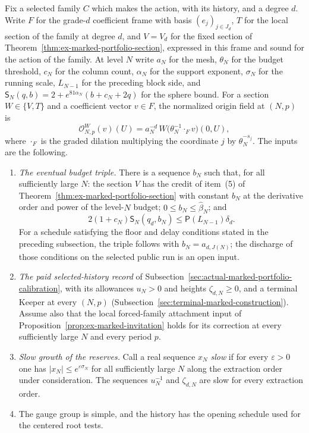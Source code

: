 Fix a selected family $C$ which makes the action, with its history, and a
degree $d$. Write $F$ for the grade-$d$ coefficient frame with basis
$(e_j)_{j\in J_d}$, $T$ for the local section of the family at degree
$d$, and $V=V_d$ for the fixed section of
Theorem~\ref{thm:ex-marked-portfolio-section}, expressed in this frame and
sound for the action of the family. At level $N$ write $a_N$ for the
mesh, $\theta_N$ for the budget threshold, $c_N$ for the column count,
$\alpha_N$ for the support exponent, $\sigma_N$ for the running scale,
$L_{N-1}$ for the preceding block side, and
$\mathsf S_N(q,b)=2+e^{81\alpha_N}(b+c_N+2q)$ for the sphere bound. For a
section $W\in\{V,T\}$ and a coefficient vector $v\in F$, the normalized
origin field at $(N,p)$ is
\[
 \mathcal O^{W}_{N,p}(v)(U)=a_N^{-d}\,
     W\bigl(\theta_N^{-1}\mathbin{\cdot_F}v\bigr)(0,U),
\]
where $\cdot_F$ is the graded dilation multiplying the coordinate $j$ by
$\theta_N^{-s_j}$. The inputs are the following.
\begin{enumerate}
\item \emph{The eventual budget triple.} There is a sequence $b_N$ such
  that, for all sufficiently large $N$: the section $V$ has the credit of
  item~(5) of Theorem~\ref{thm:ex-marked-portfolio-section} with constant
  $b_N$ at the derivative order and power of the level-$N$ budget;
  $0\leq b_N\leq\widehat\beta_N$; and
  \[
   2(1+c_N)\mathsf S_N(q_d,b_N)\leq\mathsf P(L_{N-1})\delta_d .
  \]
  For a schedule satisfying the floor and delay conditions stated in the
  preceding subsection, the triple follows with $b_N=a_{d,J(N)}$; the
  discharge of those conditions on the selected public run is an open
  input.
\item \emph{The paid selected-history record}
  of Subsection~\ref{sec:actual-marked-portfolio-calibration}, with its
  allowances $u_N>0$ and heights $\zeta_{d,N}\geq0$, and a terminal Keeper
  at every $(N,p)$ (Subsection~\ref{sec:terminal-marked-construction}).
  Assume also that the local forced-family attachment input of
  Proposition~\ref{prop:ex-marked-invitation} holds for its correction at
  every sufficiently large $N$ and every period $p$.
\item \emph{Slow growth of the reserves.} Call a real sequence $x_N$
  \emph{slow} if for every $\varepsilon>0$ one has
  $|x_N|\leq e^{\varepsilon\sigma_N}$ for all sufficiently large $N$
  along the extraction order under consideration. The sequences $u_N^{-1}$
  and $\zeta_{d,N}$ are slow for every extraction order.
\item The gauge group is simple, and the history has the opening schedule
  used for the centered root tests.
\end{enumerate}
